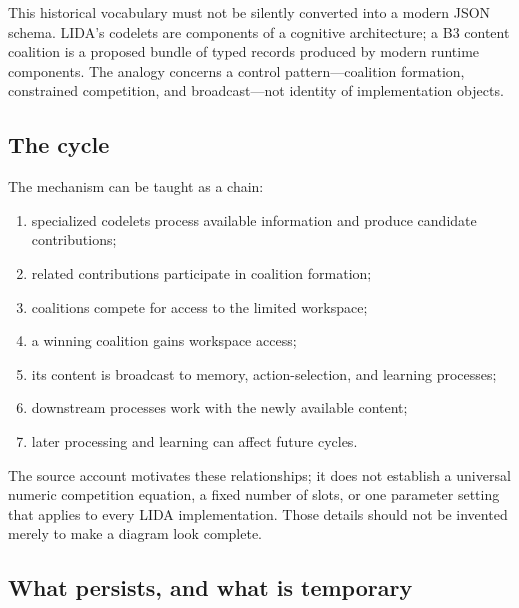 This historical vocabulary must not be silently converted into a modern JSON schema. LIDA's codelets are components of a cognitive architecture; a B3 content coalition is a proposed bundle of typed records produced by modern runtime components. The analogy concerns a control pattern—coalition formation, constrained competition, and broadcast—not identity of implementation objects.

\subsection{The cycle}

The mechanism can be taught as a chain:
\begin{enumerate}
  \item specialized codelets process available information and produce candidate contributions;
  \item related contributions participate in coalition formation;
  \item coalitions compete for access to the limited workspace;
  \item a winning coalition gains workspace access;
  \item its content is broadcast to memory, action-selection, and learning processes;
  \item downstream processes work with the newly available content;
  \item later processing and learning can affect future cycles.
\end{enumerate}

The source account motivates these relationships; it does not establish a universal numeric competition equation, a fixed number of slots, or one parameter setting that applies to every LIDA implementation. Those details should not be invented merely to make a diagram look complete.\autocite{franklin2012lida}


\subsection{What persists, and what is temporary}

